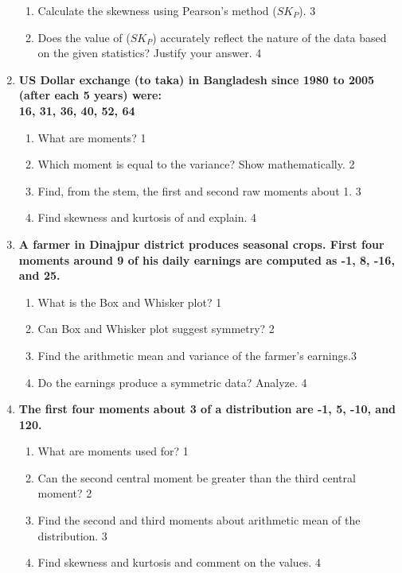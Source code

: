\documentclass[a4paper,oneside]{book}
\begin{document}
\begin{enumerate}
\begin{enumerate}
    \item  
    Calculate the skewness using Pearson's method ($SK_P$). \hfill 3
    \item
    Does the value of ($SK_P$) accurately reflect the nature of the data based on the given statistics? Justify your answer. \hfill 4
\end{enumerate}


 \item
	  \textbf{US Dollar exchange (to taka) in Bangladesh since 1980 to 2005 (after each 5 years) were: \\ 16, 31, 36, 40, 52, 64} 
  
  \begin{enumerate}
    \item
	What are moments? \hfill 1
    \item
	Which moment is equal to the variance? Show mathematically. \hfill 2
    \item  
	Find, from the stem, the first and second raw moments about 1. \hfill 3
    \item
	Find skewness and kurtosis of and explain. \hfill 4
\end{enumerate}

 \item
	  \textbf{A farmer in Dinajpur district produces seasonal crops. First four moments around 9 of his daily earnings are computed as -1, 8, -16, and 25.}
  
  \begin{enumerate}
    \item
	What is the Box and Whisker plot? \hfill 1
    \item
	Can Box and Whisker plot suggest symmetry? \hfill 2
    \item  
	 Find the arithmetic mean and variance of the farmer's earnings.\hfill 3
    \item
	Do the earnings produce a symmetric data? Analyze. \hfill 4
  \end{enumerate}

 \item
	  \textbf{The first four moments about 3 of a distribution are -1, 5, -10, and 120.} 
  
  \begin{enumerate}
    \item
	What are moments used for? \hfill 1
    \item
	Can the second central moment be greater than the third central moment? \hfill 2
    \item  
	Find the second and third moments about arithmetic mean of the distribution. \hfill 3
    \item
	Find skewness and kurtosis and comment on the values.  \hfill 4
\end{enumerate}


\end{enumerate}
\end{document}
